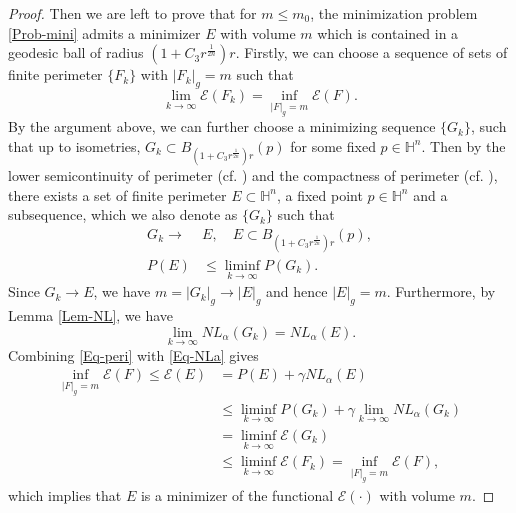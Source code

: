 \documentclass[11pt,reqno]{amsart}
\theoremstyle{definition}
\theoremstyle{remark}
\numberwithin{equation}{section}
\renewcommand{\(}{\left(}
\renewcommand{\)}{\right)}
\renewcommand{\-}{\overline}
\begin{document}
\begin{proof}
Then we are left to prove that for $m\leq m_0$, the minimization problem \eqref{Prob-mini} admits a minimizer $E$ with volume $m$ which is contained in a geodesic ball of radius $(1+C_3 r^{\frac{1}{2n}})r$. Firstly, we can choose a sequence of sets of finite perimeter $\{F_k\}$ with $|F_k|_g=m$ such that 
\begin{equation*}
	\lim_{k\to\infty}\mathcal{E}(F_k)=\inf_{|F|_g=m}{\mathcal{E}(F)}.
\end{equation*}
By the argument above, we can further choose a minimizing sequence $\{G_k\}$, such that up to isometries, $G_k\subset B_{(1+C_3 r^{\frac{1}{2n}})r}(p)$ for some fixed $p\in\mathbb{H}^n$. Then by the lower semicontinuity of perimeter (cf. \cite[Proposition 12.15]{Maggi-12}) and the compactness of perimeter (cf. \cite[Theorem 12.26]{Maggi-12}), there exists a set of finite perimeter $E\subset\mathbb{H}^n$, a fixed point $p\in\mathbb{H}^n$ and a subsequence, which we also denote as $\{G_k\}$ such that
\begin{align}
	G_k\to& E,\quad E\subset B_{(1+C_3 r^{\frac{1}{2n}})r}(p),\\
	P(E)&\leq\liminf_{k\to\infty} P(G_k).\label{Eq-peri}
\end{align}
Since $G_k\to E$, we have $m=|G_k|_g\to|E|_g$ and hence $|E|_g=m$. Furthermore, by Lemma \ref{Lem-NL}, we have
\begin{equation}\label{Eq-NLa}
	\lim_{k\to\infty}{NL_{\alpha}(G_k)}=NL_{\alpha}(E).
\end{equation}
Combining \eqref{Eq-peri} with \eqref{Eq-NLa} gives
\begin{align*}
	\inf_{|F|_g=m}{\mathcal{E}(F)}\leq\mathcal{E}(E)&=P(E)+\gamma NL_{\alpha}(E)\\
	&\leq \liminf_{k\to\infty} P(G_k)+\gamma\lim_{k\to\infty}{NL_{\alpha}(G_k)}\\
	&=\liminf_{k\to\infty}\mathcal{E}(G_k)\\
	&\leq \liminf_{k\to\infty}\mathcal{E}(F_k)=\inf_{|F|_g=m}{\mathcal{E}(F)},
\end{align*}
which implies that $E$ is a minimizer of the functional $\mathcal{E}(\cdot)$ with volume $m$. 
\end{proof}
\end{document}
